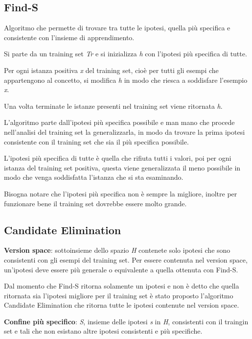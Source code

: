 \subsection{Find-S}\label{find-s}

Algoritmo che permette di trovare tra tutte le ipotesi, quella più
specifica e consistente con l'insieme di apprendimento.

Si parte da un training set \emph{Tr} e si inizializza \emph{h} con
l'ipotesi più specifica di tutte.

Per ogni istanza positiva \emph{x} del training set, cioè per tutti gli
esempi che appartengono al concetto, si modifica \emph{h} in modo che
riesca a soddisfare l'esempio \emph{x}.

Una volta terminate le istanze presenti nel training set viene ritornata
\emph{h}.

L'algoritmo parte dall'ipotesi più specifica possibile e man mano che
procede nell'analisi del training set la generalizzarla, in modo da
trovare la prima ipotesi consistente con il training set che sia il più
specifica possibile.

L'ipotesi più specifica di tutte è quella che rifiuta tutti i valori,
poi per ogni istanza del training set positiva, questa viene
generalizzata il meno possibile in modo che venga soddisfatta l'istanza
che si sta esaminando.

Bisogna notare che l'ipotesi più specifica non è sempre la migliore,
inoltre per funzionare bene il training set dovrebbe essere molto
grande.

\subsection{Candidate Elimination}\label{candidate-elimination}

\textbf{Version space}: sottoinsieme dello spazio \emph{H} contenete
solo ipotesi che sono consistenti con gli esempi del training set. Per
essere contenuta nel version space, un'ipotesi deve essere più generale
o equivalente a quella ottenuta con Find-S.

Dal momento che Find-S ritorna solamente un ipotesi e non è detto che
quella ritornata sia l'ipotesi migliore per il training set è stato
proposto l'algoritmo Candidate Elimination che ritorna tutte le ipotesi
contenute nel version space.

\textbf{Confine più specifico}: \emph{S}, insieme delle ipotesi \emph{s}
in \emph{H}, consistenti con il traingin set e tali che non esistano
altre ipotesi consistenti e più specifiche.

